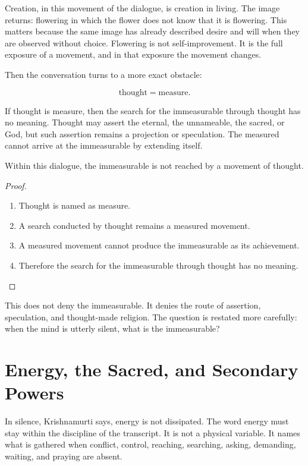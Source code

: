 Creation, in this movement of the dialogue, is creation in living. The image returns: flowering in which the flower does not know that it is flowering. This matters because the same image has already described desire and will when they are observed without choice. Flowering is not self-improvement. It is the full exposure of a movement, and in that exposure the movement changes.

Then the conversation turns to a more exact obstacle:

\begin{equation}
\text{thought} = \text{measure}.
\end{equation}

If thought is measure, then the search for the immeasurable through thought has no meaning. Thought may assert the eternal, the unnameable, the sacred, or God, but such assertion remains a projection or speculation. The measured cannot arrive at the immeasurable by extending itself.

\begin{proposition}
Within this dialogue, the immeasurable is not reached by a movement of thought.
\end{proposition}

\begin{proof}
\begin{enumerate}
\item Thought is named as measure.
\item A search conducted by thought remains a measured movement.
\item A measured movement cannot produce the immeasurable as its achievement.
\item Therefore the search for the immeasurable through thought has no meaning.
\end{enumerate}
\end{proof}

This does not deny the immeasurable. It denies the route of assertion, speculation, and thought-made religion. The question is restated more carefully: when the mind is utterly silent, what is the immeasurable?

\section{Energy, the Sacred, and Secondary Powers}

In silence, Krishnamurti says, energy is not dissipated. The word energy must stay within the discipline of the transcript. It is not a physical variable. It names what is gathered when conflict, control, reaching, searching, asking, demanding, waiting, and praying are absent.

